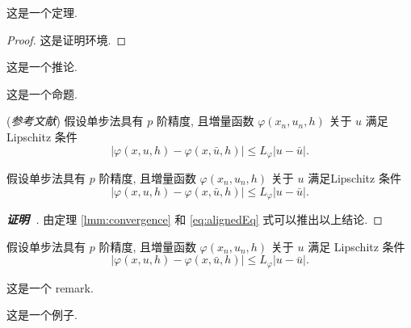\begin{theorem}[Theorem]\label{thm:foo}
这是一个定理.
\end{theorem}
\begin{proof}
这是证明环境.
\end{proof}

\begin{corollary}\label{cor:foo}
这是一个推论.
\end{corollary}

\begin{proposition}[Proposition]
这是一个命题.
\end{proposition}

\begin{lemma}\label{lmm:convergence} {\rm (\textit{参考文献}\cite{LiLiu1997})}
假设单步法具有 $p$ 阶精度, 且増量函数 $\varphi(x_{n}, u_{n}, h)$ 关于 $u$ 满足 \textup{Lipschitz} 条件
\begin{equation}\label{eq:conver1}
|\varphi(x, u, h)-\varphi(x, \bar{u}, h)| \leqslant L_{\varphi}|u-\bar{u}|.
\end{equation}
\end{lemma}

\begin{theorem}\label{thm:convergence}
假设单步法具有 $p$ 阶精度, 且増量函数 $\varphi(x_{n}, u_{n}, h)$ 关于 $u$ 满足\textup{Lipschitz} 条件
\begin{equation}\label{eq:conver2}
|\varphi(x, u, h)-\varphi(x, \bar{u}, h)| \leqslant L_{\varphi}|u-\bar{u}|.
\end{equation}
\end{theorem}
\begin{proof}[\normalfont\bfseries 证明~\nopunct]
由定理 \ref{lmm:convergence} 和 \eqref{eq:alignedEq} 式可以推出以上结论.
\end{proof}

\begin{corollary}\label{col:convergence}
假设单步法具有 $p$ 阶精度, 且増量函数 $\varphi(x_{n}, u_{n}, h)$ 关于 $u$ 满足 \textup{Lipschitz} 条件
\begin{equation}\label{eq:conver3}
|\varphi(x, u, h)-\varphi(x, \bar{u}, h)| \leqslant L_{\varphi}|u-\bar{u}|.
\end{equation}
\end{corollary}

\begin{remark}\label{rem:remark}
这是一个 remark.
\end{remark}

\begin{example}
这是一个例子.
\end{example}


